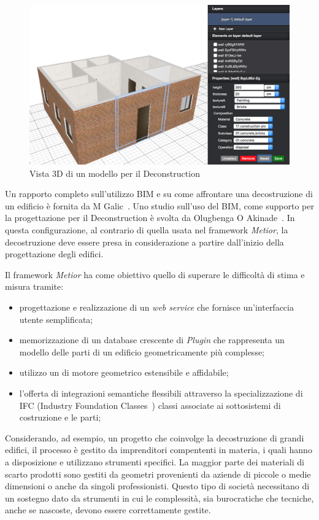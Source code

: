 \begin{figure}[htbp] %
   \centering
   \includegraphics[width=1\linewidth]{images/3d-sel}
   \caption{Vista 3D di un modello per il Deconstruction}
   \label{fig:augmented}
\end{figure}

Un rapporto completo sull'utilizzo BIM e su come affrontare una decostruzione di un edificio è fornita da M Galic~\cite{galic2014bim}.
Uno studio sull'uso del BIM, come supporto per la progettazione per il Deconstruction è svolta da Olugbenga O Akinade~\cite{akinade2015waste}.
In questa configurazione, al contrario di quella usata nel framework \emph{Metior}, la decostruzione deve essere
presa in considerazione a partire dall'inizio della progettazione degli edifici.
\newpage


Il framework \emph{Metior} ha come obiettivo quello di superare le difficoltà di stima e misura tramite:
\begin{itemize}
  \item progettazione e realizzazione di un \emph{web service} che fornisce un'interfaccia utente semplificata;
  \item memorizzazione di un database crescente di \emph{Plugin} che rappresenta un modello delle parti di un edificio geometricamente più complesse;
  \item utilizzo un di motore geometrico estensibile e affidabile;
  \item l'offerta di integrazioni semantiche flessibili attraverso la specializzazione di IFC (Industry Foundation Classes~\cite{ifc})
  classi associate ai sottosistemi di costruzione e le parti;
\end{itemize}

Considerando, ad esempio, un progetto che coinvolge la decostruzione di grandi edifici, il processo è
gestito da imprenditori compententi in materia, i quali hanno a disposizione e utilizzano strumenti specifici.
La maggior parte dei materiali di scarto prodotti sono gestiti da geometri provenienti da aziende di piccole o medie dimensioni
o anche da singoli professionisti.
Questo tipo di società necessitano di un sostegno dato da strumenti in cui le complessità,
sia burocratiche che tecniche, anche se nascoste, devono essere correttamente gestite.
\newpage
